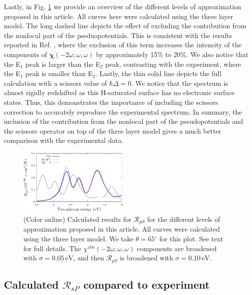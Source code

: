 \documentclass[prb,superscriptaddress,showpacs,twocolumn,letterpaper]{revtex4}
\begin{document}
Lastly, in Fig. \ref{fig:improvements} we provide an overview of the different
levels of approximation proposed in this article. All curves here were
calculated using the three layer model. The long dashed line depicts the effect
of excluding the contribution from the nonlocal part of the pseduopotentials.
This is consistent with the results reported in Ref. ,
where the exclusion of this term increases the intensity of the components of
$\boldsymbol{\chi}(-2\omega;\omega,\omega)$ by approximately 15\% to 20\%. We
also notice that the E$_{1}$ peak is larger than the E$_{2}$ peak, contrasting
with the experiment, where the E$_{1}$ peak is smaller than E$_{2}$. Lastly, the
thin solid line depicts the full calculation with a scissors value of
$\hbar\Delta = 0$. We notice that the spectrum is almost rigidly redshifted as
this H-saturated surface has no electronic surface states.\cite{andersonPRB15}
Thus, this demonstrates the importance of including the scissors correction to
accurately reproduce the experimental spectrum. In summary, the inclusion of the
contribution from the nonlocal part of the pseudopotentials and the scissors
operator on top of the three layer model gives a much better comparison with the
experimental data.

\begin{figure}[b]
\centering
\includegraphics[width=0.48\textwidth]{fig5}
\caption{(Color online) Calculated results for $\mathcal{R}_{pS}$ for the
different levels of approximation proposed in this article. All curves were
calculated using the three layer model. We take $\theta=65^{\circ}$ for this
plot. See text for full details. The
$\chi^{\mathrm{abc}}(-2\omega;\omega,\omega)$ components are broadened with
$\sigma=0.05\,\text{eV}$, and then $\mathcal{R}_{pS}$ is broadened with
$\sigma=0.10\,\text{eV}$.
\label{fig:improvements}}
\end{figure}


\subsection{Calculated \texorpdfstring{$\mathcal{R}_{sP}$}{RsP} compared to
experiment}\label{sec:RsP}
\end{document}
